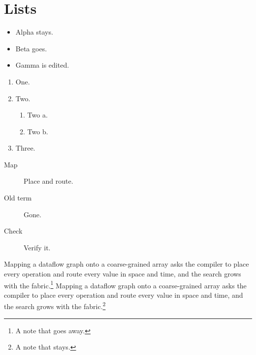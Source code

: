 \documentclass{article}
\begin{document}
\section{Lists}
\begin{itemize}
\item Alpha stays.
\item Beta goes.
\item Gamma is edited.
\end{itemize}
\begin{enumerate}
\item One.
\item Two.
\begin{enumerate}
\item Two a.
\item Two b.
\end{enumerate}
\item Three.
\end{enumerate}
\begin{description}
\item[Map] Place and route.
\item[Old term] Gone.
\item[Check] Verify it.
\end{description}
Mapping a dataflow graph onto a coarse-grained array asks the compiler to place every operation and route every value in space and time, and the search grows with the fabric.\footnote{A note that goes away.} Mapping a dataflow graph onto a coarse-grained array asks the compiler to place every operation and route every value in space and time, and the search grows with the fabric.\footnote{A note that stays.}
\end{document}
